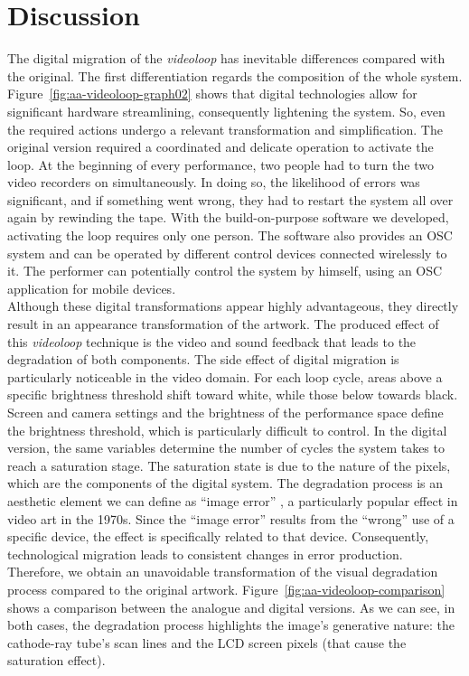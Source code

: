\section{Discussion}
The digital migration of the \textit{videoloop} has inevitable differences compared with the original. The first differentiation regards the composition of the whole system. Figure~\ref{fig:aa-videoloop-graph02} shows that digital technologies allow for significant hardware streamlining, consequently lightening the system. So, even the required actions undergo a relevant transformation and simplification. The original version required a coordinated and delicate operation to activate the loop. At the beginning of every performance, two people had to turn the two video recorders on simultaneously. In doing so, the likelihood of errors was significant, and if something went wrong, they had to restart the system all over again by rewinding the tape. With the build-on-purpose software we developed, activating the loop requires only one person. The software also provides an OSC system and can be operated by different control devices connected wirelessly to it. The performer can potentially control the system by himself, using an OSC application for mobile devices.\\
Although these digital transformations appear highly advantageous, they directly result in an appearance transformation of the artwork. The produced effect of this \textit{videoloop} technique is the video and sound feedback that leads to the degradation of both components. The side effect of digital migration is particularly noticeable in the video domain. For each loop cycle, areas above a specific brightness threshold shift toward white, while those below towards black. Screen and camera settings and the brightness of the performance space define the brightness threshold, which is particularly difficult to control. In the digital version, the same variables determine the number of cycles the system takes to reach a saturation stage. The saturation state is due to the nature of the pixels, which are the components of the digital system. The degradation process is an aesthetic element we can define as ``image error'' \cite{Gfeller2013-je}, a particularly popular effect in video art in the 1970s. Since the ``image error'' results from the ``wrong'' use of a specific device, the effect is specifically related to that device. Consequently, technological migration leads to consistent changes in error production. Therefore, we obtain an unavoidable transformation of the visual degradation process compared to the original artwork. Figure~\ref{fig:aa-videoloop-comparison} shows a comparison between the analogue and digital versions. As we can see, in both cases, the degradation process highlights the image's generative nature: the cathode-ray tube's scan lines and the LCD screen pixels (that cause the saturation effect).

